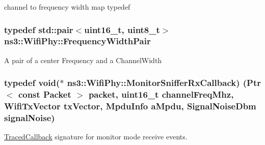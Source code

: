 channel to frequency width map typedef 

\subsubsection[{\texorpdfstring{Frequency\+Width\+Pair}{FrequencyWidthPair}}]{\setlength{\rightskip}{0pt plus 5cm}typedef std\+::pair$<$uint16\+\_\+t, uint8\+\_\+t$>$ {\bf ns3\+::\+Wifi\+Phy\+::\+Frequency\+Width\+Pair}}\hypertarget{classns3_1_1WifiPhy_abb7b47ebed22c2703bcc239729d1e40c}{}\label{classns3_1_1WifiPhy_abb7b47ebed22c2703bcc239729d1e40c}
A pair of a center Frequency and a Channel\+Width 
\subsubsection[{\texorpdfstring{Monitor\+Sniffer\+Rx\+Callback}{MonitorSnifferRxCallback}}]{\setlength{\rightskip}{0pt plus 5cm}typedef void($\ast$  ns3\+::\+Wifi\+Phy\+::\+Monitor\+Sniffer\+Rx\+Callback) ({\bf Ptr}$<$ const {\bf Packet} $>$ packet, uint16\+\_\+t channel\+Freq\+Mhz, {\bf Wifi\+Tx\+Vector} tx\+Vector, {\bf Mpdu\+Info} a\+Mpdu, {\bf Signal\+Noise\+Dbm} signal\+Noise)}\hypertarget{classns3_1_1WifiPhy_a3bfbe4d94e53d23626b60bb3b2f80e37}{}\label{classns3_1_1WifiPhy_a3bfbe4d94e53d23626b60bb3b2f80e37}
\hyperlink{classns3_1_1TracedCallback}{Traced\+Callback} signature for monitor mode receive events.


